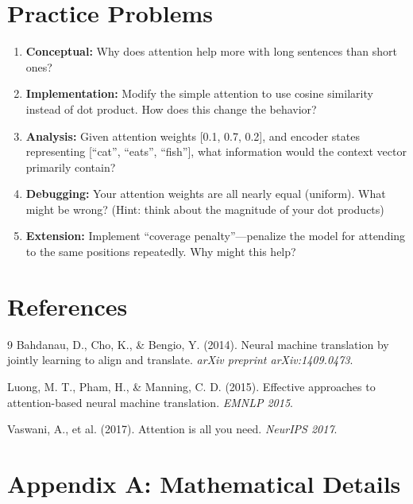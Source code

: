 \documentclass{article}
\begin{document}
\section{Practice Problems}

\begin{enumerate}
\item \textbf{Conceptual:} Why does attention help more with long sentences than short ones?

\item \textbf{Implementation:} Modify the simple attention to use cosine similarity instead of dot product. How does this change the behavior?

\item \textbf{Analysis:} Given attention weights [0.1, 0.7, 0.2], and encoder states representing [``cat'', ``eats'', ``fish''], what information would the context vector primarily contain?

\item \textbf{Debugging:} Your attention weights are all nearly equal (uniform). What might be wrong? (Hint: think about the magnitude of your dot products)

\item \textbf{Extension:} Implement ``coverage penalty''---penalize the model for attending to the same positions repeatedly. Why might this help?
\end{enumerate}

\section*{References}

\begin{thebibliography}{9}
Bahdanau, D., Cho, K., \& Bengio, Y. (2014).
Neural machine translation by jointly learning to align and translate.
\textit{arXiv preprint arXiv:1409.0473}.

Luong, M. T., Pham, H., \& Manning, C. D. (2015).
Effective approaches to attention-based neural machine translation.
\textit{EMNLP 2015}.

Vaswani, A., et al. (2017).
Attention is all you need.
\textit{NeurIPS 2017}.
\end{thebibliography}

\section*{Appendix A: Mathematical Details}
\end{document}
